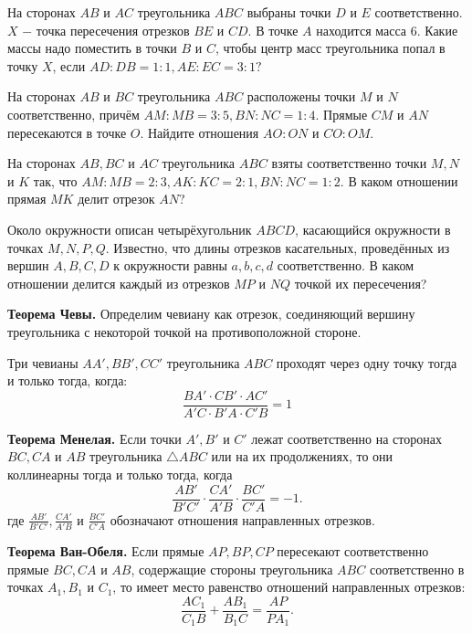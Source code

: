 \newpage

\hspace{3mm}

На сторонах $AB$ и $AC$ треугольника $ABC$ выбраны точки $D$ и $E$ соответственно. $X$ $-$ точка пересечения отрезков $BE$ и $CD$. В точке $A$ находится масса $6$. Какие массы надо поместить в точки $B$ и $C$, чтобы центр масс треугольника попал в точку $X$, если $AD : DB = 1 : 1, AE : EC = 3 : 1?$

На сторонах $AB$ и $BC$ треугольника $ABC$ расположены точки $M$ и $N$ соответственно, причём $AM : MB = 3 : 5, BN : NC = 1 : 4.$ Прямые $CM$ и $AN$ пересекаются в точке $O$. Найдите отношения $AO : ON$ и $CO : OM.$

На сторонах $AB, BC$ и $AC$ треугольника $ABC$ взяты соответственно точки $M, N$ и $K$ так, что $AM : MB = 2 : 3, AK : KC = 2 : 1, BN : NC = 1 : 2.$ В каком отношении прямая $MK$ делит отрезок $AN$?

Около окружности описан четырёхугольник $ABCD$, касающийся окружности в точках $M, N, P, Q.$ Известно, что длины отрезков касательных, проведённых из вершин $A, B, C, D$ к окружности равны $a, b, c, d$ соответственно. В каком отношении делится каждый из отрезков $MP$ и $NQ$ точкой их пересечения?

\textbf{Теорема Чевы.}
Определим чевиану как отрезок, соединяющий вершину треугольника с некоторой точкой на противоположной стороне.

Три чевианы ${\displaystyle AA',BB',CC'}$ треугольника ${\displaystyle ABC}$ проходят через одну точку тогда и только тогда, когда: 
\[{\displaystyle {\frac {BA'\cdot CB'\cdot AC'}{A'C\cdot B'A\cdot C'B}}=1}\]

\textbf{Теорема Менелая.}
Если точки $A', B'$ и $C'$ лежат соответственно на сторонах $BC, CA$ и $AB$ треугольника $\triangle ABC$ или на их продолжениях, то они коллинеарны тогда и только тогда, когда
\[
\frac{AB'}{B'C'} \cdot \frac{CA'}{A'B} \cdot \frac{BC'}{C'A} = -1.
\]
где $\frac{AB'}{B'C'}, \frac{CA'}{A'B}$ и $\frac{BC'}{C'A}$ обозначают отношения направленных отрезков.

\textbf{Теорема Ван-Обеля.}
Если прямые $AP, BP, CP$ пересекают соответственно прямые $BC, CA$ и $AB$, содержащие стороны треугольника $ABC$ соответственно в точках $A_1, B_1$ и $C_1$, то имеет место равенство отношений направленных отрезков:
\[
\frac{AC_1}{C_1B} + \frac{AB_1}{B_1C} = \frac{AP}{PA_1}.
\]